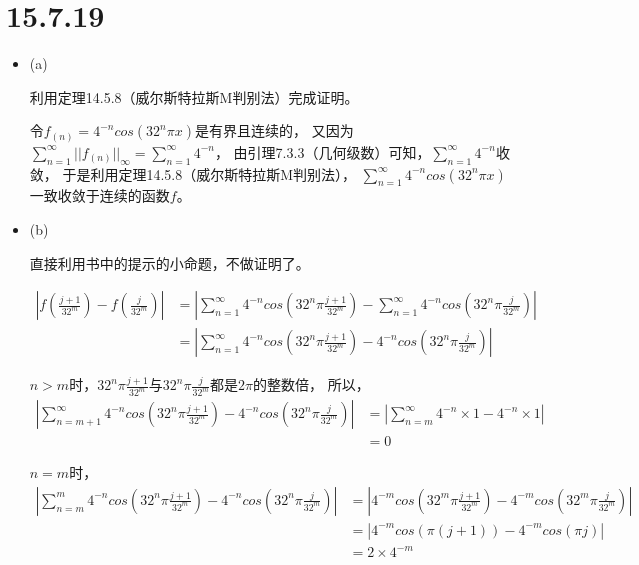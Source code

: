 \documentclass{article}
\begin{document}
\section*{15.7.19}

\begin{itemize}
  \item (a)

        利用定理14.5.8（威尔斯特拉斯M判别法）完成证明。

        令$f_(n) = 4^{-n} cos(32^n \pi x)$是有界且连续的，
        又因为$\sum \limits_{n = 1}^{\infty} ||f_(n)||_{\infty} = \sum \limits_{n = 1}^{\infty} 4^{-n}$，
        由引理7.3.3（几何级数）可知，$\sum \limits_{n = 1}^{\infty} 4^{-n}$收敛，
        于是利用定理14.5.8（威尔斯特拉斯M判别法），
        $\sum \limits_{n = 1}^{\infty} 4^{-n} cos(32^n \pi x)$
        一致收敛于连续的函数$f$。
  \item (b)

        直接利用书中的提示的小命题，不做证明了。

        \begin{align*}
          \left|f(\frac{j + 1}{32^m}) - f(\frac{j}{32^m})\right|
           & = \left|\sum\limits_{n = 1}^{\infty} 4^{-n} cos(32^n \pi \frac{j + 1}{32^m}) - \sum\limits_{n = 1}^{\infty} 4^{-n} cos(32^n \pi \frac{j}{32^m}) \right| \\
           & =  \left|\sum\limits_{n = 1}^{\infty} 4^{-n} cos(32^n \pi \frac{j + 1}{32^m}) - 4^{-n} cos(32^n \pi \frac{j}{32^m}) \right|
        \end{align*}

        $n > m$时，$32^n \pi \frac{j + 1}{32^m}$与$32^n \pi \frac{j}{32^m}$都是$2\pi$的整数倍，
        所以，
        \begin{align*}
          \left|\sum\limits_{n = m+1}^{\infty} 4^{-n} cos(32^n \pi \frac{j + 1}{32^m}) - 4^{-n} cos(32^n \pi \frac{j}{32^m}) \right|
           & = \left|\sum\limits_{n = m}^{\infty} 4^{-n} \times 1  - 4^{-n} \times 1  \right| \\
           & = 0
        \end{align*}

        $n = m$时，
        \begin{align*}
          \left|\sum\limits_{n = m}^{m} 4^{-n} cos(32^n \pi \frac{j + 1}{32^m}) - 4^{-n} cos(32^n \pi \frac{j}{32^m}) \right|
           & = \left|4^{-m} cos(32^m \pi \frac{j + 1}{32^m}) - 4^{-m} cos(32^m \pi \frac{j}{32^m}) \right| \\
           & = \left|4^{-m} cos(\pi (j + 1)) - 4^{-m} cos(\pi j) \right|                                   \\
           & = 2 \times 4^{-m}
        \end{align*}


\end{itemize}
\end{document}

